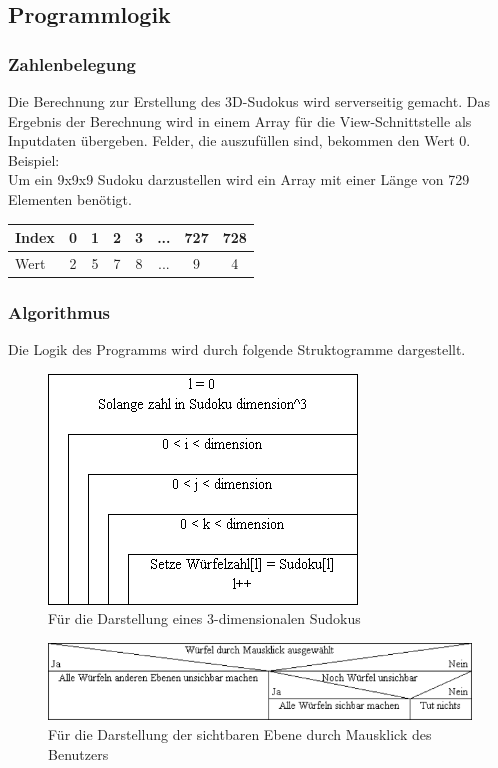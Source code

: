 \documentclass[a4paper,12pt]{scrreprt}
\begin{document}
	\subsection{Programmlogik}
	\subsubsection{Zahlenbelegung}
	Die Berechnung zur Erstellung des 3D-Sudokus wird serverseitig gemacht. Das Ergebnis der
	Berechnung wird in einem Array f\"ur die View-Schnittstelle als Inputdaten \"ubergeben. Felder,
	die auszuf\"ullen sind, bekommen den Wert 0.\medskip \\
	Beispiel:\medskip \\
	Um ein 9x9x9 Sudoku darzustellen wird ein Array mit einer L\"ange von 729 Elementen ben\"otigt.\medskip \\
	\begin{tabular}{l|c|c|c|c|c|c|c}
		\hline
		Index & 0 & 1 & 2 & 3 & ... & 727 & 728 \\
		\hline
		Wert & 2 & 5 & 7 & 8 & ... & 9 & 4 \\
		\hline
	\end{tabular}

	\subsubsection{Algorithmus}
	Die Logik des Programms wird durch folgende Struktogramme dargestellt.
	\begin{figure}[h]
		\includegraphics[scale=0.7]{pictures/Struktogramm1}
		\caption{F\"ur die Darstellung eines 3-dimensionalen Sudokus}
	\end{figure}
	\begin{figure}[h]
		\includegraphics[scale=0.7]{pictures/Struktogramm2}
		\caption{F\"ur die Darstellung der sichtbaren Ebene durch Mausklick des Benutzers}
	\end{figure}
	
\end{document}
